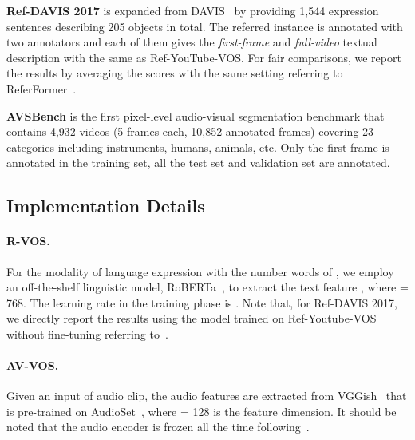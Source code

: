 \documentclass{article}
\begin{document}
\textbf{Ref-DAVIS 2017} is expanded from DAVIS~\cite{pont20172017} by providing 1,544 expression sentences describing 205 objects in total. The referred instance is annotated with two annotators and each of them gives the \textit{first-frame} and \textit{full-video} textual description with the same as Ref-YouTube-VOS. For fair comparisons, we report the results by averaging the scores with the same setting referring to ReferFormer~\cite{wu2022language}.

\textbf{AVSBench} is the first pixel-level audio-visual segmentation benchmark that contains 4,932 videos (5 frames each, 10,852 annotated frames) covering 23 categories including instruments, humans, animals, etc. Only the first frame is annotated in the training set, all the test set and validation set are annotated.

\subsection{Implementation Details}
\paragraph{R-VOS.} For the modality of language expression with the number words of , we employ an off-the-shelf linguistic model, RoBERTa~\cite{liu2019roberta}, to extract the text feature , where  = 768. The learning rate in the training phase is . Note that, for Ref-DAVIS 2017, we directly report the results using the model trained on Ref-Youtube-VOS without fine-tuning referring to~\cite{wu2022language}.

\paragraph{AV-VOS.} Given an input of audio clip, the audio features  are extracted from  VGGish~\cite{hershey2017cnn} that is pre-trained on AudioSet~\cite{gemmeke2017audio}, where  = 128 is the feature dimension. It should be noted that the audio encoder is frozen all the time following~\cite{zhou2022audio}.
\end{document}
